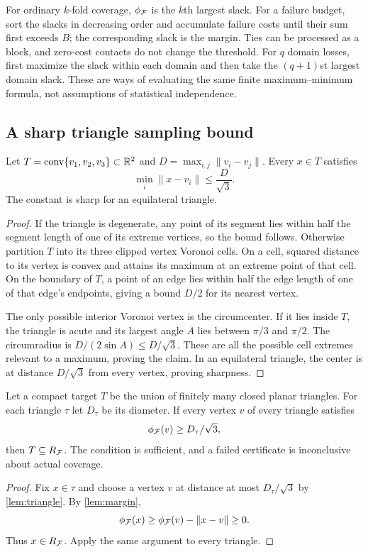 For ordinary $k$-fold coverage, $\phi_{\mathcal F}$ is the $k$th largest slack. For a failure budget, sort the slacks in decreasing order and accumulate failure costs until their sum first exceeds $B$; the corresponding slack is the margin. Ties can be processed as a block, and zero-cost contacts do not change the threshold. For $q$ domain losses, first maximize the slack within each domain and then take the $(q+1)$st largest domain slack. These are ways of evaluating the same finite maximum--minimum formula, not assumptions of statistical independence.

\subsection{A sharp triangle sampling bound}
\begin{lemma}\label{lem:triangle}
Let $T=\operatorname{conv}\{v_1,v_2,v_3\}\subset\mathbb R^2$ and $D=\max_{i,j}\|v_i-v_j\|$. Every $x\in T$ satisfies
\begin{equation}\label{eq:triangle-distance}
\min_i\|x-v_i\|\le\frac D{\sqrt3}.
\end{equation}
The constant is sharp for an equilateral triangle.
\end{lemma}
\begin{proof}
If the triangle is degenerate, any point of its segment lies within half the segment length of one of its extreme vertices, so the bound follows. Otherwise partition $T$ into its three clipped vertex Voronoi cells. On a cell, squared distance to its vertex is convex and attains its maximum at an extreme point of that cell. On the boundary of $T$, a point of an edge lies within half the edge length of one of that edge's endpoints, giving a bound $D/2$ for its nearest vertex.

The only possible interior Voronoi vertex is the circumcenter. If it lies inside $T$, the triangle is acute and its largest angle $A$ lies between $\pi/3$ and $\pi/2$. The circumradius is $D/(2\sin A)\le D/\sqrt3$. These are all the possible cell extremes relevant to a maximum, proving the claim. In an equilateral triangle, the center is at distance $D/\sqrt3$ from every vertex, proving sharpness.
\end{proof}

\begin{theorem}\label{thm:target}
Let a compact target $T$ be the union of finitely many closed planar triangles. For each triangle $\tau$ let $D_\tau$ be its diameter. If every vertex $v$ of every triangle satisfies
\begin{equation}\label{eq:triangle-cert}
\phi_{\mathcal F}(v)\ge D_\tau/\sqrt3,
\end{equation}
then $T\subseteq R_{\mathcal F}$. The condition is sufficient, and a failed certificate is inconclusive about actual coverage.
\end{theorem}
\begin{proof}
Fix $x\in\tau$ and choose a vertex $v$ at distance at most $D_\tau/\sqrt3$ by \cref{lem:triangle}. By \cref{lem:margin},
\[
\phi_{\mathcal F}(x)\ge\phi_{\mathcal F}(v)-\|x-v\|\ge0.
\]
Thus $x\in R_{\mathcal F}$. Apply the same argument to every triangle.
\end{proof}

